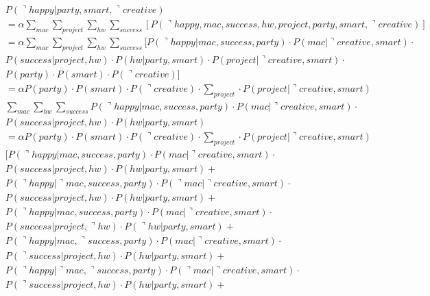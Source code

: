 \documentclass[letterpaper, 12pt]{artikel3}
\begin{document}
\begin{align*}
&P(\urcorner happy| party, smart, \urcorner creative) \\
& = \alpha\sum_{mac} \sum_{project} \sum_{hw} \sum_{success} [P(\urcorner happy, mac, success, hw, project,party,smart, \urcorner  creative) ] \\
& = \alpha\sum_{mac} \sum_{project} \sum_{hw} \sum_{success} [P(\urcorner happy |mac, success, party)\cdot P(mac| \urcorner creative, smart) \cdot \\
& P(success | project, hw) \cdot P(hw| party, smart) \cdot P(project|\urcorner  creative, smart) \cdot \\
& P(party)\cdot P(smart) \cdot  P(\urcorner creative)]\\
& = \alpha  P(party)\cdot P(smart) \cdot  P(\urcorner creative)   \cdot \sum_{project}  \cdot  P(project|\urcorner  creative, smart) \\
& \sum_{mac}\sum_{hw} \sum_{success} P(\urcorner happy |mac, success, party) \cdot P(mac| \urcorner creative, smart) \cdot \\
& P(success | project, hw) \cdot P(hw| party, smart) \\
& = \alpha  P(party)\cdot P(smart) \cdot  P(\urcorner creative)   \cdot \sum_{project}  \cdot  P(project|\urcorner  creative, smart)  \\
& [P(\urcorner happy |mac, success, party) \cdot P(mac| \urcorner creative, smart) \cdot \\
& P(success | project, hw) \cdot P(hw| party, smart) +\\
& P(\urcorner happy |\urcorner mac, success, party) \cdot P( \urcorner mac| \urcorner creative, smart) \cdot \\
& P(success | project, hw) \cdot P(hw| party, smart)  +\\
& P(\urcorner happy |mac, success, party) \cdot P(mac| \urcorner creative, smart) \cdot \\
& P(success | project, \urcorner hw) \cdot P(\urcorner hw| party, smart) +\\
& P(\urcorner happy |mac,\urcorner success, party) \cdot P(mac| \urcorner creative, smart) \cdot \\
& P(\urcorner success | project, hw) \cdot P(hw| party, smart) +\\
& P(\urcorner happy |\urcorner mac,\urcorner success, party) \cdot P(\urcorner mac| \urcorner creative, smart) \cdot \\
& P(\urcorner success | project, hw) \cdot P(hw| party, smart) +\\

\end{align*}
\end{document}
